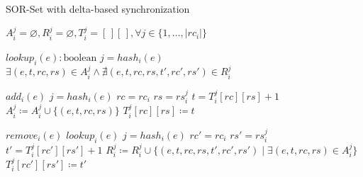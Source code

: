 \begin{algorithm}[t]
\small{
	\caption{SOR-Set with delta-based synchronization}
 	\label{alg:sor_set}                       

 	\begin{algorithmic}[1]
      \State \Payload $A_{i}^{j} = \varnothing, R_{i}^{j} = \varnothing, T_{i}^{j} = [\,][\,], \forall j \in \{1,\ldots,|rc_{i}|\}$
      \State \textcolor{gray}{}

 	  \State \Query $lookup_{i}(e) : \text{boolean}$
 	  \State \hspace{\algorithmicindent} \Let $j = hash_{i}(e)$
 	  \State \hspace{\algorithmicindent} \Return $\exists (e, t, rc, rs) \in A_{i}^{j} \land \nexists (e, t, rc, rs, t', rc', rs') \in R_{i}^{j}$

 	  \State \Update $add_{i}(e)$
 	  \State \hspace{\algorithmicindent} \Let $j = hash_{i}(e)$
 	  \State \hspace{\algorithmicindent} \Let $rc = rc_{i}$
 	  \State \hspace{\algorithmicindent} \Let $rs = rs_{i}^{j}$
 	  \State \hspace{\algorithmicindent} \Let $t = T_{i}^{j}[rc][rs] + 1$
 	  \State \hspace{\algorithmicindent} $A_{i}^{j} \coloneqq A_{i}^{j} \cup \{(e, t, rc, rs)\}$
 	  \State \hspace{\algorithmicindent} $T_{i}^{j}[rc][rs] \coloneqq t$

 	  \State \Update $remove_{i}(e)$
 	  \State \hspace{\algorithmicindent} \Pre $lookup_{i}(e)$
 	  \State \hspace{\algorithmicindent} \Let $j = hash_{i}(e)$
 	  \State \hspace{\algorithmicindent} \Let $rc' = rc_{i}$
 	  \State \hspace{\algorithmicindent} \Let $rs' = rs_{i}^{j}$
 	  \State \hspace{\algorithmicindent} \Let $t' = T_{i}^{j}[rc'][rs'] + 1$
 	  \State \hspace{\algorithmicindent} $R_{i}^{j} \coloneqq R_{i}^{j} \cup \{(e, t, rc, rs, t', rc', rs') \mid \exists (e, t, rc, rs) \in A_{i}^{j}\}$
 	  \State \hspace{\algorithmicindent} $T_{i}^{j}[rc'][rs'] \coloneqq t'$
 	  

\end{algorithmic}}
\end{algorithm}
